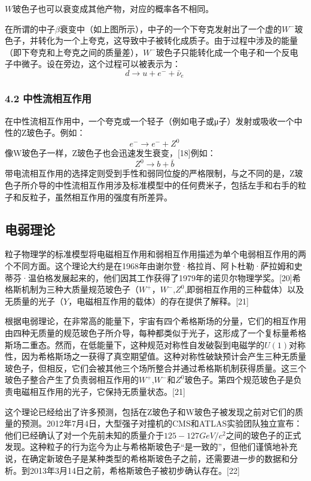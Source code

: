 $W$玻色子也可以衰变成其他产物，对应的概率各不相同。

在所谓的中子$\beta$衰变中（如上图所示），中子的一个下夸克发射出了一个虚的$W^-$玻色子，并转化为一个上夸克，这导致中子被转化成质子。由于过程中涉及的能量（即下夸克和上夸克之间的质量差），$W^-$玻色子只能转化成一个电子和一个反电子中微子。设在旁边，这个过程可以被表示为：
$$d \rightarrow u + e^{-} + \bar{\nu}_e~$$

\subsubsection{4.2 中性流相互作用}
在中性流相互作用中，一个夸克或一个轻子（例如电子或μ子）发射或吸收一个中性的Z玻色子。例如：
\begin{equation}
e^- \rightarrow e^- + Z^0~
\end{equation}
像W玻色子一样，Z玻色子也会迅速发生衰变，[18]例如：
\begin{equation}
Z^0 \rightarrow b + \bar{b}~
\end{equation}
带电流相互作用的选择定则受到手性和弱同位旋的严格限制，与之不同的是，Z玻色子所介导的中性流相互作用涉及标准模型中的任何费米子，包括左手和右手的粒子和反粒子，虽然相互作用的强度有所差异。

\subsection{电弱理论}
粒子物理学的标准模型将电磁相互作用和弱相互作用描述为单个电弱相互作用的两个不同方面。这个理论大约是在1968年由谢尔登·格拉肖、阿卜杜勒·萨拉姆和史蒂芬·温伯格发展起来的，他们因其工作获得了1979年的诺贝尔物理学奖。[20]希格斯机制为三种大质量规范玻色子（$W^{+}$，$W^{-}$,$Z^{0}$,即弱相互作用的三种载体）以及无质量的光子（$Y$，电磁相互作用的载体）的存在提供了解释。[21]

根据电弱理论，在非常高的能量下，宇宙有四个希格斯场的分量，它们的相互作用由四种无质量的规范玻色子所介导，每种都类似于光子，这形成了一个复标量希格斯场二重态。然而，在低能量下，这种规范对称性自发破裂到电磁学的$U(1)$对称性，因为希格斯场之一获得了真空期望值。这种对称性破缺预计会产生三种无质量玻色子，但相反，它们会被其他三个场所整合并通过希格斯机制获得质量。这三个玻色子整合产生了负责弱相互作用的$W^{+}$,$W^{-}$和$Z^{0}$玻色子。第四个规范玻色子是负责电磁相互作用的光子，它保持无质量状态。[21]

这个理论已经给出了许多预测，包括在Z玻色子和W玻色子被发现之前对它们的质量的预测。2012年7月4日，大型强子对撞机的CMS和ATLAS实验团队独立宣布：他们已经确认了对一个先前未知的质量介于$125-127GeV/c^{2}$之间的玻色子的正式发现。这种粒子的行为迄今为止与希格斯玻色子“是一致的”，但他们谨慎地补充说，在确定新玻色子是某种类型的希格斯玻色子之前，还需要进一步的数据和分析。到2013年3月14日之前，希格斯玻色子被初步确认存在。[22]


